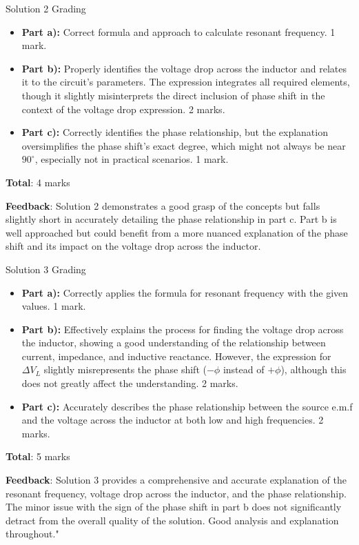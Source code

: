 \documentclass[a4paper,11pt]{article}
\begin{document}
Solution 2 Grading

\begin{itemize}
    \item \textbf{Part a):} Correct formula and approach to calculate resonant frequency. 1 mark.
    \item \textbf{Part b):} Properly identifies the voltage drop across the inductor and relates it to the circuit's parameters. The expression integrates all required elements, though it slightly misinterprets the direct inclusion of phase shift in the context of the voltage drop expression. 2 marks.
    \item \textbf{Part c):} Correctly identifies the phase relationship, but the explanation oversimplifies the phase shift's exact degree, which might not always be near \(90^\circ\), especially not in practical scenarios. 1 mark.
\end{itemize}

\textbf{Total}: 4 marks

\textbf{Feedback}: Solution 2 demonstrates a good grasp of the concepts but falls slightly short in accurately detailing the phase relationship in part c. Part b is well approached but could benefit from a more nuanced explanation of the phase shift and its impact on the voltage drop across the inductor.

Solution 3 Grading

\begin{itemize}
    \item \textbf{Part a):} Correctly applies the formula for resonant frequency with the given values. 1 mark.
    \item \textbf{Part b):} Effectively explains the process for finding the voltage drop across the inductor, showing a good understanding of the relationship between current, impedance, and inductive reactance. However, the expression for \( \Delta V_{L} \) slightly misrepresents the phase shift (\(-\phi\) instead of \(+\phi\)), although this does not greatly affect the understanding. 2 marks.
    \item \textbf{Part c):} Accurately describes the phase relationship between the source e.m.f and the voltage across the inductor at both low and high frequencies. 2 marks.
\end{itemize}

\textbf{Total}: 5 marks

\textbf{Feedback}: Solution 3 provides a comprehensive and accurate explanation of the resonant frequency, voltage drop across the inductor, and the phase relationship. The minor issue with the sign of the phase shift in part b does not significantly detract from the overall quality of the solution. Good analysis and explanation throughout."
\end{document}

